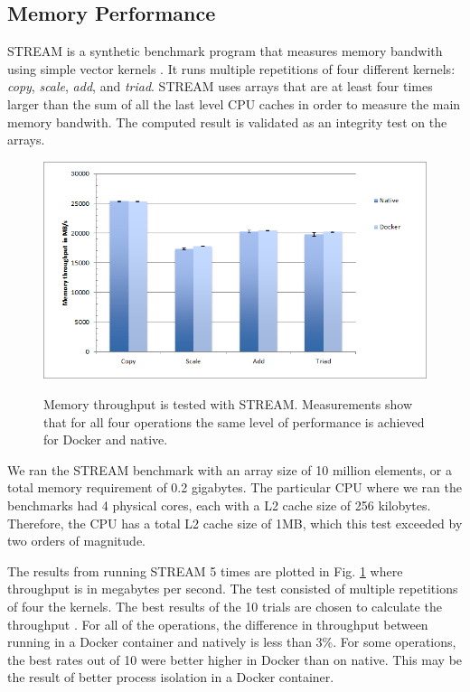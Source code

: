 \documentclass[11pt]{article}
\begin{document}
\subsection{Memory Performance}
STREAM is a synthetic benchmark program that measures memory bandwith using simple vector kernels \cite{mccalpin}. It runs multiple repetitions of four different kernels: \textit{copy}, \textit{scale}, \textit{add}, and \textit{triad}. STREAM uses arrays that are at least four times larger than the sum of all the last level CPU caches in order to measure the main memory bandwith. The computed result is validated as an integrity test on the arrays. 

\begin{figure}
	\centering
	{\includegraphics[width=150mm]{mem}}
	\caption{  Memory throughput is tested with STREAM. Measurements show
		that for all four operations the same level of performance is achieved for Docker and native. }
	\label{fig:mem}
\end{figure}


We ran the
STREAM benchmark with an array size of 10 million elements, or
a total memory requirement of 0.2 gigabytes. The particular CPU
where we ran the benchmarks had 4 physical cores, each with a L2 cache size of 256 kilobytes. 
Therefore, the CPU has a total L2 cache size of 1MB, which this test exceeded by
two orders of magnitude.

The results from running STREAM 5 times are plotted in Fig. \ref{fig:mem} where throughput is in megabytes per second. 
The test consisted of multiple repetitions of four the kernels. The best results of the 10 trials are chosen to calculate the throughput \cite{mccalpin}. 
For all of the operations, the difference in throughput between running in a Docker container and natively is less than 3\%. For some operations, the best rates out of 10 were better higher in Docker than on native. This may be the result of better process isolation in a Docker container. 
\end{document}
